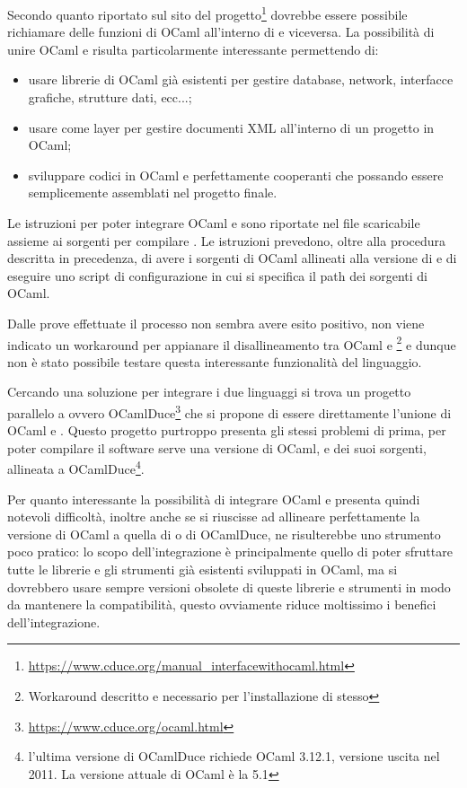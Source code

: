 Secondo quanto riportato sul sito del progetto\footnote{\url{https://www.cduce.org/manual_interfacewithocaml.html}} dovrebbe essere possibile richiamare delle funzioni di OCaml all'interno di \cduce e viceversa. La possibilità di unire OCaml e \cduce risulta particolarmente interessante permettendo di:
\begin{itemize}
	\item usare librerie di OCaml già esistenti per gestire database, network, interfacce grafiche, strutture dati, ecc...;
	\item usare \cduce come layer per gestire documenti XML all'interno di un progetto in OCaml;
	\item sviluppare codici in OCaml e \cduce perfettamente cooperanti che possando essere semplicemente assemblati nel progetto finale.
\end{itemize} 

Le istruzioni per poter integrare OCaml e \cduce sono riportate nel file  scaricabile assieme ai sorgenti per compilare \cduce. Le istruzioni prevedono, oltre alla procedura descritta in precedenza, di avere i sorgenti di OCaml allineati alla versione di \cduce e di eseguire uno script di configurazione in cui si specifica il path dei sorgenti di OCaml.

Dalle prove effettuate il processo non sembra avere esito positivo, non viene indicato un workaround per appianare il disallineamento tra OCaml e \cduce\footnote{Workaround descritto e necessario per l'installazione di \cduce stesso} e dunque non è stato possibile testare questa interessante funzionalità del linguaggio.

Cercando una soluzione per integrare i due linguaggi si trova un progetto parallelo a \cduce ovvero OCamlDuce\footnote{\url{https://www.cduce.org/ocaml.html}} che si propone di essere direttamente l'unione di OCaml e \cduce. Questo progetto purtroppo presenta gli stessi problemi di prima, per poter compilare il software serve una versione di OCaml, e dei suoi sorgenti, allineata a OCamlDuce\footnote{l'ultima versione di OCamlDuce richiede OCaml 3.12.1, versione uscita nel 2011. La versione attuale di OCaml è la 5.1}.

Per quanto interessante la possibilità di integrare OCaml e \cduce presenta quindi notevoli difficoltà, inoltre anche se si riuscisse ad allineare perfettamente la versione di OCaml a quella di \cduce o di OCamlDuce, ne risulterebbe uno strumento poco pratico: lo scopo dell'integrazione è principalmente quello di poter sfruttare tutte le librerie e gli strumenti già esistenti sviluppati in OCaml, ma si dovrebbero usare sempre versioni obsolete di queste librerie e strumenti in modo da mantenere la compatibilità, questo ovviamente riduce moltissimo i benefici dell'integrazione.

